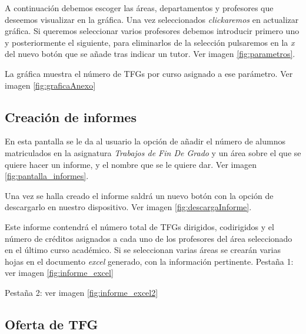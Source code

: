 
A continuación debemos escoger las áreas, departamentos y profesores que deseemos visualizar en la gráfica. Una vez seleccionados \emph{clickaremos} en actualizar gráfica.
Si queremos seleccionar varios profesores debemos introducir primero uno y posteriormente el siguiente, para eliminarlos de la selección pulsaremos en la \emph{x} del nuevo botón que se añade tras indicar un tutor. Ver imagen \ref{fig:parametros}.


La gráfica muestra el número de TFGs por curso asignado a ese parámetro. Ver imagen \ref{fig:graficaAnexo}


\subsection{Creación de informes}
En esta pantalla se le da al usuario la opción de añadir el número de alumnos matriculados en la asignatura \emph{Trabajos de Fin De Grado} y un área sobre el que se quiere hacer un informe, y el nombre que se le quiere dar. 
Ver imagen \ref{fig:pantalla_informes}.


Una vez se halla creado el informe saldrá un nuevo botón con la opción de descargarlo en nuestro dispositivo. Ver imagen \ref{fig:descargaInforme}.


Este informe contendrá el número total de TFGs dirigidos, codirigidos y el número de créditos asignados a cada uno de los profesores del área seleccionado en el último curso académico. Si se seleccionan varias áreas se crearán varias hojas en el documento \emph{excel} generado, con la información pertinente. 
Pestaña 1: ver imagen \ref{fig:informe_excel}

Pestaña 2: ver imagen \ref{fig:informe_excel2}

\subsection{Oferta de TFG}

